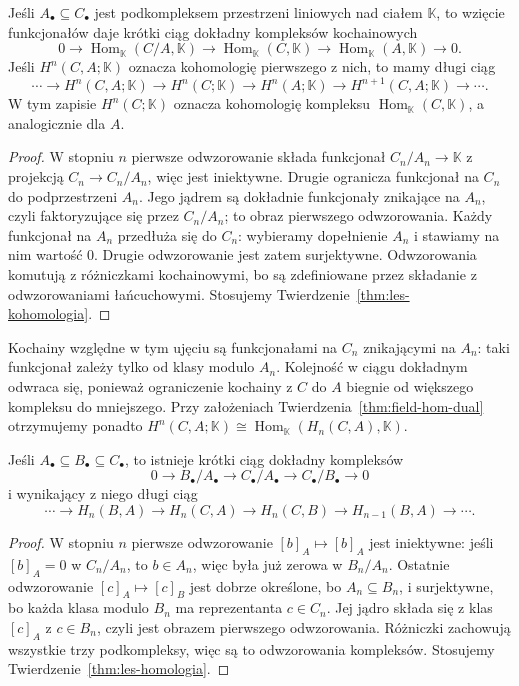 \begin{stwierdzenie}
\label{prop:wzgledna-kohomologia}
Jeśli $A_\bullet\subseteq C_\bullet$
jest podkompleksem przestrzeni liniowych
nad ciałem $\mathbb K$, to wzięcie
funkcjonałów daje krótki ciąg dokładny
kompleksów kochainowych
\[
 0\to\operatorname{Hom}_{\mathbb K}
      (C/A,\mathbb K)
 \to\operatorname{Hom}_{\mathbb K}(C,\mathbb K)
 \to\operatorname{Hom}_{\mathbb K}(A,\mathbb K)
 \to0.
\]
Jeśli $H^n(C,A;\mathbb K)$ oznacza
kohomologię pierwszego z nich, to mamy
długi ciąg
\[
 \cdots\to H^n(C,A;\mathbb K)\to H^n(C;\mathbb K)
 \to H^n(A;\mathbb K)\to H^{n+1}(C,A;\mathbb K)
 \to\cdots .
\]
W tym zapisie $H^n(C;\mathbb K)$
oznacza kohomologię kompleksu
$\operatorname{Hom}_{\mathbb K}(C,\mathbb K)$,
a analogicznie dla $A$.
\end{stwierdzenie}
\begin{proof}
W stopniu $n$ pierwsze odwzorowanie składa
funkcjonał $C_n/A_n\to\mathbb K$
z projekcją $C_n\to C_n/A_n$,
więc jest iniektywne.
Drugie ogranicza funkcjonał na $C_n$
do podprzestrzeni $A_n$.
Jego jądrem są dokładnie funkcjonały
znikające na $A_n$, czyli faktoryzujące
się przez $C_n/A_n$; to obraz
pierwszego odwzorowania. Każdy funkcjonał
na $A_n$ przedłuża się do $C_n$:
wybieramy dopełnienie $A_n$
i stawiamy na nim wartość $0$.
Drugie odwzorowanie jest zatem surjektywne.
Odwzorowania komutują z różniczkami
kochainowymi, bo są zdefiniowane
przez składanie z odwzorowaniami łańcuchowymi.
Stosujemy
Twierdzenie~\ref{thm:les-kohomologia}.
\end{proof}

Kochainy względne w tym ujęciu są funkcjonałami na $C_n$
znikającymi na $A_n$: taki funkcjonał zależy tylko od klasy
modulo $A_n$. Kolejność w ciągu dokładnym odwraca się,
ponieważ ograniczenie kochainy z $C$ do $A$ biegnie od
większego kompleksu do mniejszego. Przy założeniach
Twierdzenia~\ref{thm:field-hom-dual} otrzymujemy ponadto
$H^n(C,A;\mathbb K)\cong
\operatorname{Hom}_{\mathbb K}(H_n(C,A),\mathbb K)$.

\begin{stwierdzenie}
\label{prop:les-potrojny}
Jeśli $A_\bullet\subseteq B_\bullet
\subseteq C_\bullet$, to istnieje
krótki ciąg dokładny kompleksów
\[
 0\longrightarrow B_\bullet/A_\bullet
 \longrightarrow C_\bullet/A_\bullet
 \longrightarrow C_\bullet/B_\bullet
 \longrightarrow0
\]
i wynikający z niego długi ciąg
\[
 \cdots\to H_n(B,A)\to H_n(C,A)\to H_n(C,B)
 \to H_{n-1}(B,A)\to\cdots.
\]
\end{stwierdzenie}
\begin{proof}
W stopniu $n$ pierwsze odwzorowanie
$[b]_A\mapsto[b]_A$ jest iniektywne:
jeśli $[b]_A=0$ w $C_n/A_n$, to
$b\in A_n$, więc była już zerowa w
$B_n/A_n$. Ostatnie odwzorowanie
$[c]_A\mapsto[c]_B$ jest dobrze
określone, bo $A_n\subseteq B_n$,
i surjektywne, bo każda klasa modulo
$B_n$ ma reprezentanta $c\in C_n$.
Jej jądro składa się z klas
$[c]_A$ z $c\in B_n$, czyli jest
obrazem pierwszego odwzorowania.
Różniczki zachowują wszystkie trzy
podkompleksy, więc są to odwzorowania
kompleksów. Stosujemy
Twierdzenie~\ref{thm:les-homologia}.
\end{proof}

